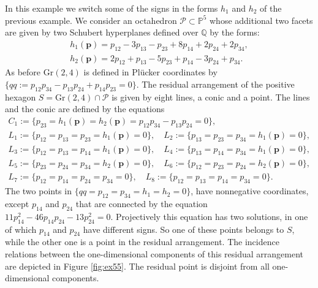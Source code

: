 \documentclass[12pt]{extarticle}
\theoremstyle{definition}
\newenvironment{example}
{\pushQED{\qed}\renewcommand{\qedsymbol}{$\diamond$}\examplex}
{\popQED\endexamplex}
\begin{document}
\begin{example} \label{ex:schub}
    In this example we switch some of the signs in the forms $h_1$ and $h_2$ of the previous example. We consider an octahedron $\mathcal{P} \subset \mathbb{P}^5$ whose additional two facets are given by two Schubert hyperplanes defined over $\mathbb{Q}$ by the forms:
    \begin{gather*}
         h_1(\mathbf{p}) = p_{12} - 3p_{13} - p_{23} + 8p_{14} + 2p_{24}+2p_{34},\\
    h_2(\mathbf{p}) = 2p_{12} + p_{13} - 5p_{23}+p_{14}-3p_{24}+p_{34}.
    \end{gather*}
     As before $\mathrm{Gr}(2,4)$ is defined in Pl\"ucker coordinates by $\{qq:=p_{12}p_{34}-p_{13}p_{24}+p_{14}p_{23}=0\}$.
    The residual arrangement of the positive hexagon $S = \mathrm{Gr}(2,4)\cap \mathcal{P}$ is given by eight lines, a conic and a point. The lines and the conic are defined by the equations
    \begin{gather*}
   C_1:=\{ p_{23} = h_{1}(\mathbf{p}) = h_{2}(\mathbf{p}) = p_{12}p_{34}-p_{13}p_{24} = 0\},\\
        L_1:=\{p_{12} = p_{13} = p_{23} = h_{1}(\mathbf{p}) = 0\},\quad L_2:=\{p_{13} = p_{23} = p_{34} = h_{1}(\mathbf{p}) = 0\},\\
        L_3:=\{p_{12} = p_{13} = p_{14} = h_{1}(\mathbf{p}) = 0\}, \quad L_4:=\{p_{13} = p_{14} = p_{34} = h_{1}(\mathbf{p}) = 0\},\\
         L_5:=\{p_{23} = p_{24} = p_{34} = h_{2}(\mathbf{p}) = 0\}, \quad L_6:=\{p_{12} = p_{23} = p_{24} = h_{2}(\mathbf{p}) = 0\},\\
        L_7:=\{p_{12} = p_{14} = p_{24} = p_{34} = 0\}, \quad L_8:=\{p_{12} = p_{13} = p_{14} = p_{34} = 0\}.
    \end{gather*}
    The two points in $\{qq=p_{12}=p_{34}=h_1=h_2=0\}$, have nonnegative coordinates, except $p_{14}$ and $p_{24}$ that are connected by the equation
$11p_{14}^2-46p_{14}p_{24}-13p_{24}^2=0$. Projectively this equation has two solutions, in one of which $p_{14}$ and $p_{24}$ have different signs. So one of these points belongs to $S$, while the other one is a point in the residual arrangement. The incidence relations between the one-dimensional components of this residual arrangement are depicted in Figure \ref{fig:ex55}. The residual point is disjoint from all one-dimensional components.


\begin{figure}
    \centering
\end{figure}
\end{example}
\end{document}
